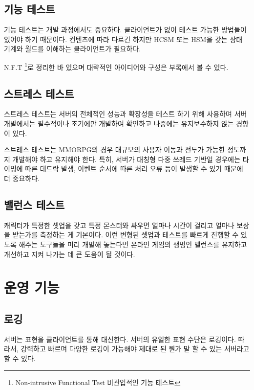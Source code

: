 \documentclass[chapter,kosection, 10.5pt, romanfixed, a4paper]{oblivoir}
\begin{document}
\subsection{기능 테스트}

기능 테스트는 개발 과정에서도 중요하다. 클라이언트가 없이 테스트 가능한 방법들이 있어야 하기 때문이다. 
컨텐츠에 따라 다르긴 하지만 HCSM 또는 HSM을 갖는 상태 기계와 월드를 이해하는 클라이언트가 필요하다. 

N.F.T \footnote{Non-intrusive Functional Test 비관입적인 기능 테스트}로 정리한 바 있으며 대략적인 아이디어와 
구성은 부록에서 볼 수 있다. 

\subsection{스트레스 테스트}

스트레스 테스트는 서버의 전체적인 성능과 확장성을 테스트 하기 위해 사용하며 
서버 개발에서는 필수적이나 초기에만 개발하여 확인하고 나중에는 유지보수하지 
않는 경향이 있다. 

스트레스 테스트는 MMORPG의 경우 대규모의 사용자 이동과 전투가 가능한 정도까지 
개발해야 하고 유지해야 한다. 특히, 서버가 대칭형 다중 쓰레드 기반일 경우에는
타이밍에 따른 데드락 발생, 이벤트 순서에 따른 처리 오류 등이 발생할 수 있기 
때문에 더 중요하다. 

\subsection{밸런스 테스트}

캐릭터가 특정한 셋업을 갖고 특정 몬스터와 싸우면 얼마나 시간이 걸리고 얼마나 보상을 
받는가를 측정하는 게 기본이다. 이런 변형된 셋업과 테스트를 빠르게 진행할 수 있도록 
해주는 도구들을 미리 개발해 놓는다면 온라인 게임의 생명인 밸런스를 유지하고 개선하고 
지켜 나가는 데 큰 도움이 될 것이다. 


\section{운영 기능}

\subsection{로깅}

서버는 표현을 클라이언트를 통해 대신한다. 서버의 유일한 표현 수단은 로깅이다. 
따라서, 강력하고 빠르며 다양한 로깅이 가능해야 제대로 된 뭔가 말 할 수 있는
서버라고 할 수 있다. 
\end{document}

